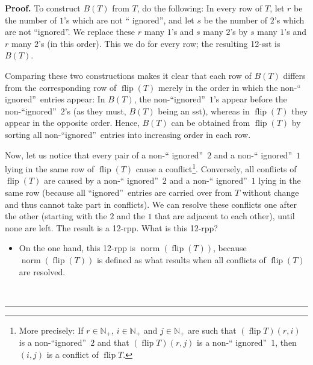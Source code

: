 \documentclass[numbers=enddot,12pt,final,onecolumn,notitlepage]{scrartcl}%
\theoremstyle{definition}
\newenvironment{proof}[1][Proof]{\noindent\textbf{#1.} }{\ \rule{0.5em}{0.5em}}
\begin{document}
\begin{proof}
To construct $B\left(  T\right)  $ from $T$, do the following: In every row of
$T$, let $r$ be the number of $1$'s which are not \textquotedblleft
ignored\textquotedblright, and let $s$ be the number of $2$'s which are not
\textquotedblleft ignored\textquotedblright. We replace these $r$ many $1$'s
and $s$ many $2$'s by $s$ many $1$'s and $r$ many $2$'s (in this order). This
we do for every row; the resulting 12-sst is $B\left(  T\right)  $.

Comparing these two constructions makes it clear that each row of $B\left(
T\right)  $ differs from the corresponding row of $\operatorname*{flip}\left(
T\right)  $ merely in the order in which the non-\textquotedblleft
ignored\textquotedblright\ entries appear: In $B\left(  T\right)  $, the
non-\textquotedblleft ignored\textquotedblright\ $1$'s appear before the
non-\textquotedblleft ignored\textquotedblright\ $2$'s (as they must,
$B\left(  T\right)  $ being an sst), whereas in $\operatorname*{flip}\left(
T\right)  $ they appear in the opposite order. Hence, $B\left(  T\right)  $
can be obtained from $\operatorname*{flip}\left(  T\right)  $ by sorting all
non-\textquotedblleft ignored\textquotedblright\ entries into increasing order
in each row.

Now, let us notice that every pair of a non-\textquotedblleft
ignored\textquotedblright\ $2$ and a non-\textquotedblleft
ignored\textquotedblright\ $1$ lying in the same row of $\operatorname*{flip}%
\left(  T\right)  $ cause a conflict\footnote{More precisely: If
$r\in\mathbb{N}_{+}$, $i\in\mathbb{N}_{+}$ and $j\in\mathbb{N}_{+}$ are such
that $\left(  \operatorname*{flip}T\right)  \left(  r,i\right)  $ is a
non-\textquotedblleft ignored\textquotedblright\ $2$ and that $\left(
\operatorname*{flip}T\right)  \left(  r,j\right)  $ is a non-\textquotedblleft
ignored\textquotedblright\ $1$, then $\left(  i,j\right)  $ is a conflict of
$\operatorname*{flip}T$.}. Conversely, all conflicts of $\operatorname*{flip}%
\left(  T\right)  $ are caused by a non-\textquotedblleft
ignored\textquotedblright\ $2$ and a non-\textquotedblleft
ignored\textquotedblright\ $1$ lying in the same row (because all
\textquotedblleft ignored\textquotedblright\ entries are carried over from $T$
without change and thus cannot take part in conflicts). We can resolve these
conflicts one after the other (starting with the $2$ and the $1$ that are
adjacent to each other), until none are left. The result is a 12-rpp. What is
this 12-rpp?

\begin{itemize}
\item On the one hand, this 12-rpp is $\operatorname*{norm}\left(
\operatorname*{flip}\left(  T\right)  \right)  $, because
$\operatorname*{norm}\left(  \operatorname*{flip}\left(  T\right)  \right)  $
is defined as what results when all conflicts of $\operatorname*{flip}\left(
T\right)  $ are resolved.


\end{itemize}
\end{proof}
\end{document}
